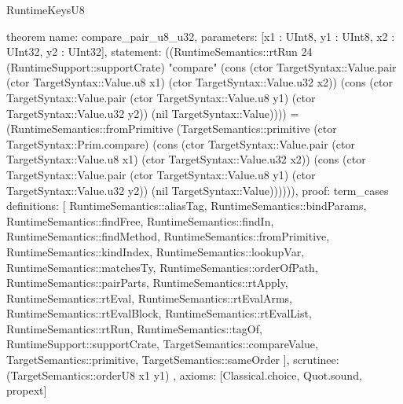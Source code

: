 \begin{lexlean}{RuntimeKeysU8}
\begin{semanticmodule}
theorem{
  name: compare_pair_u8_u32,
  parameters: [x1 : UInt8, y1 : UInt8, x2 : UInt32, y2 : UInt32],
  statement: ((RuntimeSemantics::rtRun 24 (RuntimeSupport::supportCrate) "compare" (cons (ctor TargetSyntax::Value.pair (ctor TargetSyntax::Value.u8 x1) (ctor TargetSyntax::Value.u32 x2)) (cons (ctor TargetSyntax::Value.pair (ctor TargetSyntax::Value.u8 y1) (ctor TargetSyntax::Value.u32 y2)) (nil TargetSyntax::Value)))) = (RuntimeSemantics::fromPrimitive (TargetSemantics::primitive (ctor TargetSyntax::Prim.compare) (cons (ctor TargetSyntax::Value.pair (ctor TargetSyntax::Value.u8 x1) (ctor TargetSyntax::Value.u32 x2)) (cons (ctor TargetSyntax::Value.pair (ctor TargetSyntax::Value.u8 y1) (ctor TargetSyntax::Value.u32 y2)) (nil TargetSyntax::Value)))))),
  proof: term_cases{
    definitions: [
      RuntimeSemantics::aliasTag,
      RuntimeSemantics::bindParams,
      RuntimeSemantics::findFree,
      RuntimeSemantics::findIn,
      RuntimeSemantics::findMethod,
      RuntimeSemantics::fromPrimitive,
      RuntimeSemantics::kindIndex,
      RuntimeSemantics::lookupVar,
      RuntimeSemantics::matchesTy,
      RuntimeSemantics::orderOfPath,
      RuntimeSemantics::pairParts,
      RuntimeSemantics::rtApply,
      RuntimeSemantics::rtEval,
      RuntimeSemantics::rtEvalArms,
      RuntimeSemantics::rtEvalBlock,
      RuntimeSemantics::rtEvalList,
      RuntimeSemantics::rtRun,
      RuntimeSemantics::tagOf,
      RuntimeSupport::supportCrate,
      TargetSemantics::compareValue,
      TargetSemantics::primitive,
      TargetSemantics::sameOrder
    ],
    scrutinee: (TargetSemantics::orderU8 x1 y1)
  },
  axioms: [Classical.choice, Quot.sound, propext]
}


\end{semanticmodule}
\end{lexlean}
